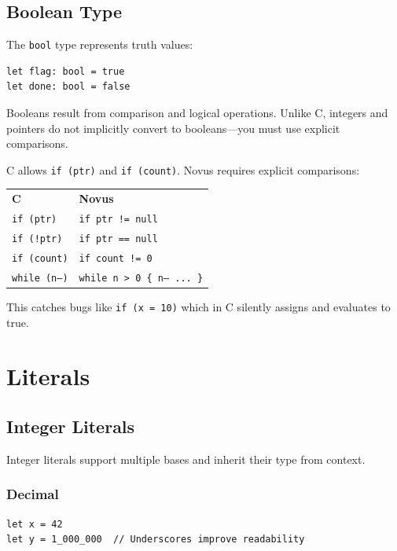\subsection{Boolean Type}

The \texttt{bool} type represents truth values:

\begin{lstlisting}
let flag: bool = true
let done: bool = false
\end{lstlisting}

Booleans result from comparison and logical operations. Unlike C, integers and pointers do not implicitly convert to booleans---you must use explicit comparisons.

\begin{comingfromc}
C allows \texttt{if (ptr)} and \texttt{if (count)}. Novus requires explicit comparisons:

\begin{tabular}{ll}
\textbf{C} & \textbf{Novus} \\
\texttt{if (ptr)} & \texttt{if ptr != null} \\
\texttt{if (!ptr)} & \texttt{if ptr == null} \\
\texttt{if (count)} & \texttt{if count != 0} \\
\texttt{while (n--)} & \texttt{while n > 0 \{ n-- ... \}} \\
\end{tabular}

This catches bugs like \texttt{if (x = 10)} which in C silently assigns and evaluates to true.
\end{comingfromc}

\section{Literals}

\subsection{Integer Literals}

Integer literals support multiple bases and inherit their type from context.

\subsubsection{Decimal}

\begin{lstlisting}
let x = 42
let y = 1_000_000  // Underscores improve readability
\end{lstlisting}

